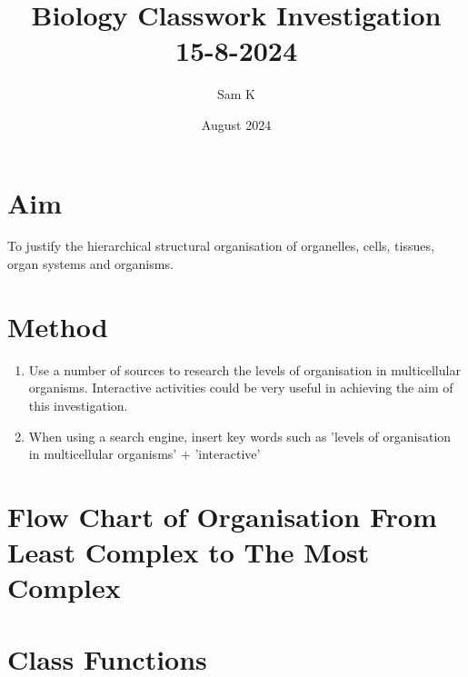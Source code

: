 \documentclass{article}
\title{Biology Classwork Investigation 15-8-2024}
\author{Sam K}
\date{August 2024}
\begin{document}
\maketitle

\section{Aim}
To justify the hierarchical structural organisation of organelles, cells, tissues, organ systems and organisms.

\section{Method}
\begin{enumerate}
    \item Use a number of sources to research the levels of organisation in multicellular organisms. Interactive  activities could be very useful in achieving the aim of this investigation. 
    \item When using a search engine, insert key words such as 'levels of organisation in multicellular organisms' + 'interactive' 
\end{enumerate}


\section{Flow Chart of Organisation From Least Complex to The Most Complex}
    \begin{center}
    \end{center}

\section{Class Functions}
\end{document}
